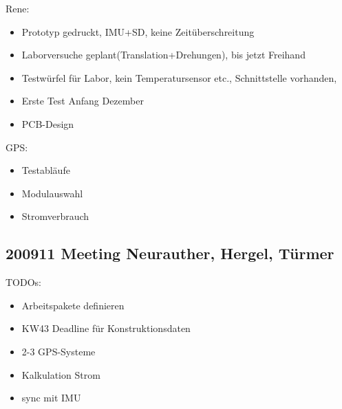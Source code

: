 \documentclass{article}
\begin{document}
Rene:
\begin{itemize}
\item
Prototyp gedruckt, IMU+SD, keine Zeitüberschreitung
\item
Laborversuche geplant(Translation+Drehungen), bis jetzt Freihand
\item
Testwürfel für Labor, kein Temperatursensor etc., Schnittstelle vorhanden,
\item
Erste Test Anfang Dezember
\item
PCB-Design
\end{itemize}

GPS:
\begin{itemize}
\item
Testabläufe
\item
Modulauswahl
\item
Stromverbrauch
\end{itemize}


\subsection{200911 Meeting Neurauther, Hergel, Türmer}
TODOs:
\begin{itemize}
\item
Arbeitspakete definieren
\item
KW43 Deadline für Konstruktionsdaten
\item
2-3 GPS-Systeme
\item
Kalkulation Strom
\item
sync mit IMU

\end{itemize}


\end{document}
